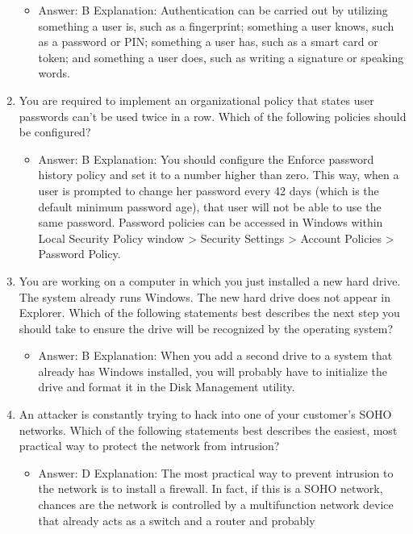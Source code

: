 \documentclass{article}
\begin{document}
\begin{enumerate}
    \begin{itemize}
        \item Answer: B
Explanation: Authentication can be carried out by utilizing something a user is, such as
a fingerprint; something a user knows, such as a password or PIN; something a user
has, such as a smart card or token; and something a user does, such as writing a signature
or speaking words.
    \end{itemize}
    \item You are required to implement an organizational policy that states
user passwords can’t be used twice in a row. Which of the following
policies should be configured?
    \begin{itemize}
        \item Answer: B
Explanation: You should configure the Enforce password history policy and set it to
a number higher than zero. This way, when a user is prompted to change her password
every 42 days (which is the default minimum password age), that user will not
be able to use the same password. Password policies can be accessed in Windows
within Local Security Policy window > Security Settings > Account Policies > Password
Policy.
    \end{itemize}
    \item You are working on a computer in which you just installed a new
hard drive. The system already runs Windows. The new hard drive
does not appear in Explorer. Which of the following statements
best describes the next step you should take to ensure the drive
will be recognized by the operating system?
    \begin{itemize}
        \item Answer: B
Explanation: When you add a second drive to a system that already has Windows
installed, you will probably have to initialize the drive and format it in the Disk
Management utility.
    \end{itemize}
    \item An attacker is constantly trying to hack into one of your customer’s
SOHO networks. Which of the following statements best describes
the easiest, most practical way to protect the network from
intrusion?
    \begin{itemize}
        \item Answer: D
Explanation: The most practical way to prevent intrusion to the network is to install a
firewall. In fact, if this is a SOHO network, chances are the network is controlled by a
multifunction network device that already acts as a switch and a router and probably

\end{itemize}
\end{enumerate}
\end{document}
